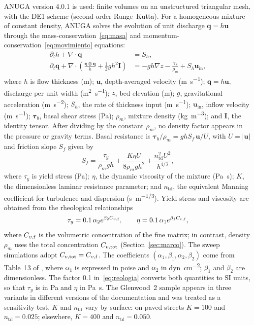 ANUGA version 4.0.1 \citep{anuga} is used: finite volumes on an unstructured triangular mesh, with the DE1 scheme (second-order Runge--Kutta). For a homogeneous mixture of constant density, ANUGA solves the evolution of unit discharge $\mathbf q=h\mathbf u$ through the mass-conservation~\eqref{eq:masa} and momentum-conservation~\eqref{eq:movimiento} equations:
\begin{align}
\partial_t h+\nabla\cdot\mathbf q&=S_h,\label{eq:masa}\\
\partial_t\mathbf q+\nabla\cdot\left(\frac{\mathbf q\otimes\mathbf q}{h}+\tfrac12 gh^2\mathbf I\right)&=-gh\nabla z-\frac{\boldsymbol\tau_b}{\rho_m}+S_h\mathbf u_\mathrm{in},\label{eq:movimiento}
\end{align}
where $h$ is flow thickness (\si{m}); $\mathbf u$, depth-averaged velocity (\si{m.s^{-1}}); $\mathbf q=h\mathbf u$, discharge per unit width (\si{m^2.s^{-1}}); $z$, bed elevation (\si{m}); $g$, gravitational acceleration (\si{m.s^{-2}}); $S_h$, the rate of thickness input (\si{m.s^{-1}}); $\mathbf u_\mathrm{in}$, inflow velocity (\si{m.s^{-1}}); $\boldsymbol\tau_b$, basal shear stress (\si{Pa}); $\rho_m$, mixture density (\si{kg.m^{-3}}); and $\mathbf I$, the identity tensor. After dividing by the constant $\rho_m$, no density factor appears in the pressure or gravity terms. Basal resistance is $\boldsymbol\tau_b/\rho_m=ghS_f\,\mathbf u/U$, with $U=|\mathbf u|$ and friction slope $S_f$ given by
\begin{equation}
S_f=\frac{\tau_y}{\rho_m g h}+\frac{K\eta U}{8\rho_m g h^2}+\frac{n_\mathrm{td}^2U^2}{h^{4/3}},\label{eq:friccion}
\end{equation}
where $\tau_y$ is yield stress (\si{Pa}); $\eta$, the dynamic viscosity of the mixture (\si{Pa.s}); $K$, the dimensionless laminar resistance parameter; and $n_\mathrm{td}$, the equivalent Manning coefficient for turbulence and dispersion (\si{s.m^{-1/3}}). Yield stress and viscosity are obtained from the rheological relationships
\begin{equation}
\tau_y=0.1\,\alpha_2e^{\beta_2C_{v,\mathrm{f}}},\qquad \eta=0.1\,\alpha_1e^{\beta_1C_{v,\mathrm{f}}},\label{eq:reologia}
\end{equation}
where $C_{v,\mathrm{f}}$ is the volumetric concentration of the fine matrix; in contrast, density $\rho_m$ uses the total concentration $C_{v,\mathrm{tot}}$ (Section~\ref{sec:marco}). The sweep simulations adopt $C_{v,\mathrm{tot}}=C_{v,\mathrm{f}}$. The coefficients $(\alpha_1,\beta_1,\alpha_2,\beta_2)$ come from Table~13 of \citet{flo2d2021}, where $\alpha_1$ is expressed in poise and $\alpha_2$ in \si{dyn.cm^{-2}}; $\beta_1$ and $\beta_2$ are dimensionless. The factor 0.1 in~\eqref{eq:reologia} converts both quantities to SI units, so that $\tau_y$ is in \si{Pa} and $\eta$ in \si{Pa.s}. The Glenwood~2 sample appears in three variants in different versions of the documentation and was treated as a sensitivity test. $K$ and $n_\mathrm{td}$ vary by surface: on paved streets $K=100$ and $n_\mathrm{td}=0.025$; elsewhere, $K=400$ and $n_\mathrm{td}=0.050$.


